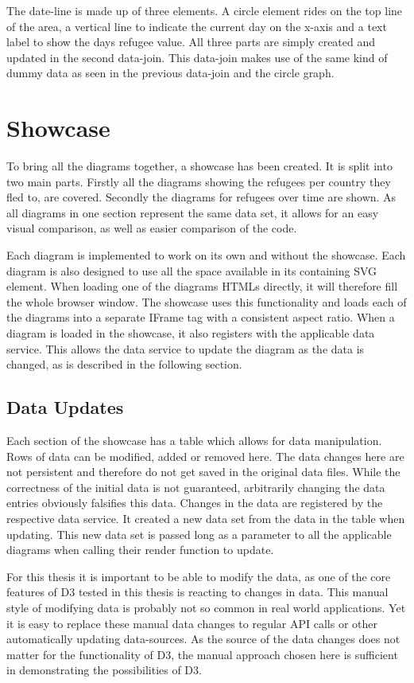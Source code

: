 The date-line is made up of three elements. A circle element rides on the top line of the area, a vertical line to indicate the current day on the x-axis and a text label to show the days refugee value. All three parts are simply created and updated in the second data-join. This data-join makes use of the same kind of dummy data as seen in the previous data-join and the circle graph.


\section{Showcase}

To bring all the diagrams together, a showcase has been created. It  is split into two main parts. Firstly all the diagrams showing the  refugees per country they fled to, are covered. Secondly the diagrams for refugees over time are shown. As all diagrams in one section represent the same data set, it allows for an easy visual comparison, as well as easier comparison of the code.

Each diagram is implemented to work on its own and without the showcase. Each diagram is also designed to use all the space available in its containing SVG element. When loading one of the diagrams HTMLs directly, it will therefore fill the whole browser window. The showcase uses this functionality and loads each of the diagrams into a separate IFrame tag with a consistent aspect ratio. When a diagram is loaded in the showcase, it also registers with the applicable data service. This allows the data service to update the diagram as the data is changed, as is described in the following section.

\subsection{Data Updates}

Each section of the showcase has a table which allows for data manipulation. Rows of data can be modified, added or removed here. The data changes here are not persistent and therefore do not get saved in the original data files. While the correctness of the initial data is not guaranteed, arbitrarily changing the data entries obviously falsifies this data. Changes in the data are registered by the respective data service. It created a new data set from the data in the table when updating. This new data set is passed long as a parameter to all the applicable diagrams when calling their render function to update.

For this thesis it is important to be able to modify the data, as one of the core features of D3 tested in this thesis is reacting to changes in data. This manual style of modifying data is probably not so common in real world applications. Yet it is easy to replace these manual data changes to regular API calls or other automatically updating data-sources. As the source of the data changes does not matter for the functionality of D3, the manual approach chosen here is sufficient in demonstrating the possibilities of D3.
